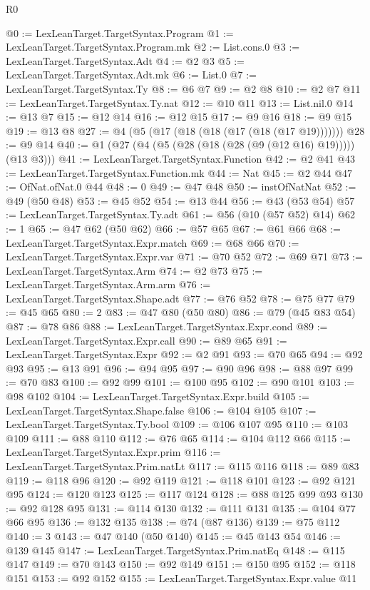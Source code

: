 \begin{lexlean}{R0}
\begin{coremodule}
@0 := LexLeanTarget.TargetSyntax.Program
@1 := LexLeanTarget.TargetSyntax.Program.mk
@2 := List.cons.{0}
@3 := LexLeanTarget.TargetSyntax.Adt
@4 := @2 @3
@5 := LexLeanTarget.TargetSyntax.Adt.mk
@6 := List.{0}
@7 := LexLeanTarget.TargetSyntax.Ty
@8 := @6 @7
@9 := @2 @8
@10 := @2 @7
@11 := LexLeanTarget.TargetSyntax.Ty.nat
@12 := @10 @11
@13 := List.nil.{0}
@14 := @13 @7
@15 := @12 @14
@16 := @12 @15
@17 := @9 @16
@18 := @9 @15
@19 := @13 @8
@27 := @4 (@5 (@17 (@18 (@18 (@17 (@18 (@17 @19)))))))
@28 := @9 @14
@40 := @1 (@27 (@4 (@5 (@28 (@18 (@28 (@9 (@12 @16) @19))))) (@13 @3)))
@41 := LexLeanTarget.TargetSyntax.Function
@42 := @2 @41
@43 := LexLeanTarget.TargetSyntax.Function.mk
@44 := Nat
@45 := @2 @44
@47 := OfNat.ofNat.{0} @44
@48 := 0
@49 := @47 @48
@50 := instOfNatNat
@52 := @49 (@50 @48)
@53 := @45 @52
@54 := @13 @44
@56 := @43 (@53 @54)
@57 := LexLeanTarget.TargetSyntax.Ty.adt
@61 := @56 (@10 (@57 @52) @14)
@62 := 1
@65 := @47 @62 (@50 @62)
@66 := @57 @65
@67 := @61 @66
@68 := LexLeanTarget.TargetSyntax.Expr.match
@69 := @68 @66
@70 := LexLeanTarget.TargetSyntax.Expr.var
@71 := @70 @52
@72 := @69 @71
@73 := LexLeanTarget.TargetSyntax.Arm
@74 := @2 @73
@75 := LexLeanTarget.TargetSyntax.Arm.arm
@76 := LexLeanTarget.TargetSyntax.Shape.adt
@77 := @76 @52
@78 := @75 @77
@79 := @45 @65
@80 := 2
@83 := @47 @80 (@50 @80)
@86 := @79 (@45 @83 @54)
@87 := @78 @86
@88 := LexLeanTarget.TargetSyntax.Expr.cond
@89 := LexLeanTarget.TargetSyntax.Expr.call
@90 := @89 @65
@91 := LexLeanTarget.TargetSyntax.Expr
@92 := @2 @91
@93 := @70 @65
@94 := @92 @93
@95 := @13 @91
@96 := @94 @95
@97 := @90 @96
@98 := @88 @97
@99 := @70 @83
@100 := @92 @99
@101 := @100 @95
@102 := @90 @101
@103 := @98 @102
@104 := LexLeanTarget.TargetSyntax.Expr.build
@105 := LexLeanTarget.TargetSyntax.Shape.false
@106 := @104 @105
@107 := LexLeanTarget.TargetSyntax.Ty.bool
@109 := @106 @107 @95
@110 := @103 @109
@111 := @88 @110
@112 := @76 @65
@114 := @104 @112 @66
@115 := LexLeanTarget.TargetSyntax.Expr.prim
@116 := LexLeanTarget.TargetSyntax.Prim.natLt
@117 := @115 @116
@118 := @89 @83
@119 := @118 @96
@120 := @92 @119
@121 := @118 @101
@123 := @92 @121 @95
@124 := @120 @123
@125 := @117 @124
@128 := @88 @125 @99 @93
@130 := @92 @128 @95
@131 := @114 @130
@132 := @111 @131
@135 := @104 @77 @66 @95
@136 := @132 @135
@138 := @74 (@87 @136)
@139 := @75 @112
@140 := 3
@143 := @47 @140 (@50 @140)
@145 := @45 @143 @54
@146 := @139 @145
@147 := LexLeanTarget.TargetSyntax.Prim.natEq
@148 := @115 @147
@149 := @70 @143
@150 := @92 @149
@151 := @150 @95
@152 := @118 @151
@153 := @92 @152
@155 := LexLeanTarget.TargetSyntax.Expr.value @11

\end{coremodule}
\end{lexlean}
